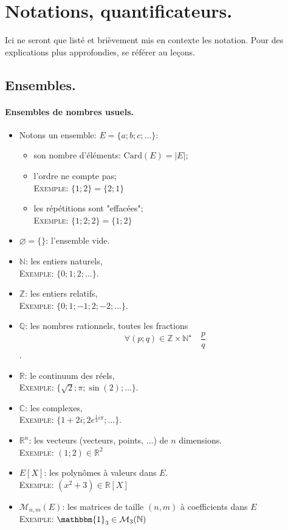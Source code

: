 \documentclass{article}
\newcommand{\Ex}{\textsc{Exemple}: }
\begin{document}
\section{Notations, quantificateurs.}
Ici ne seront que listé et brièvement mis en contexte les notation.
Pour des explications plus approfondies, se référer au leçons.

\subsection{Ensembles.}

\paragraph{Ensembles de nombres usuels.}
\begin{itemize}
    \item Notons un ensemble: $E = \{a; b; c; ...\}$:
    \begin{itemize}
        \item son nombre d'éléments: $\text{Card}({E}) = |E|$;
        \item l'ordre ne compte pas; \\
        \Ex $\{1; 2\} = \{2; 1\}$
        \item les répétitions sont "effacées"; \\
        \Ex $\{1; 2; 2\} = \{1; 2\}$
    \end{itemize} 
    \item $\varnothing = \{\}$: l'ensemble vide.
    \item $\mathbb{N}$: les entiers naturels, \\
        \Ex $\{0; 1; 2; \dots\}$. 
    \item $\mathbb{Z}$: les entiers relatifs, \\ 
        \Ex $\{0; 1; -1; 2; -2; ...\}$.
    \item $\mathbb{Q}$: les nombres rationnels, toutes les fractions 
    $$
    \forall (p; q) \in \mathbb{Z}\times \mathbb{N}^{\star} \quad 
    \frac{p}{q}
    $$.
    \item $\mathbb{R}$: le continuum des réels, \\
        \Ex $\{\sqrt{2}; \pi; \sin(2); \dots\}$.
    \item $\mathbb{C}$: les complexes, \\
        \Ex $\{1 + 2i; 2e^{\frac{1}{4}i\pi}; \dots\}$.
    \item $\mathbb{R}^{n}$: les vecteurs (vecteurs, points, $\dots$) de $n$ dimensions. \\
        \Ex $(1; 2) \in \mathbb{R}^2$
    \item $E[X]$: les polynômes à valeurs dans $E$. \\
        \Ex $(x^2 + 3) \in \mathbb{R}[X]$ 
    \item $\mathcal{M}_{n, m}(E)$: les matrices de taille $(n, m)$ 
        à coefficients dans $E$ \\
        \Ex $\mathbbm{1}_3 \in \mathcal{M}_{3}(\mathbb{N})$
\end{itemize}
\end{document}
